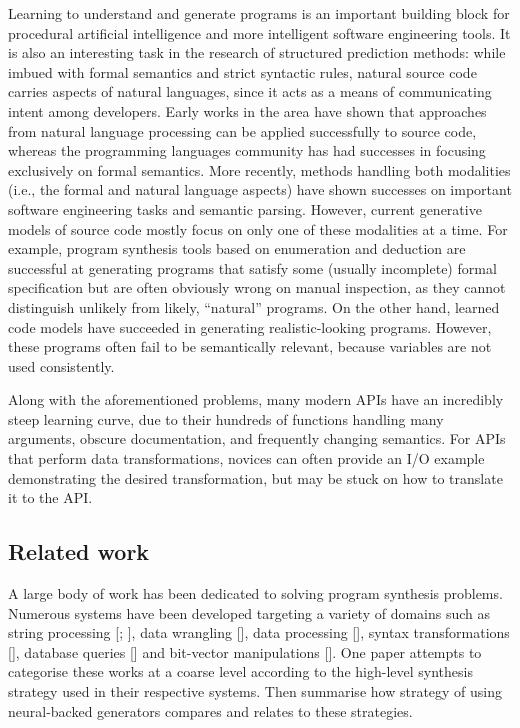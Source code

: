 \documentclass{article}
\begin{document}
Learning to understand and generate programs is an important building block for procedural artificial intelligence and more intelligent software engineering tools. It is also an interesting task in the research of structured prediction methods: while imbued with formal semantics and strict syntactic rules, natural source code carries aspects of natural languages, since it acts as a means of communicating intent among developers. Early works in the area have shown that approaches from natural language processing can be applied successfully to source code, whereas the programming languages community has had successes in focusing exclusively on formal semantics. More recently, methods handling both modalities (i.e., the formal and natural language aspects) have shown successes on important software engineering tasks and semantic parsing. However, current generative models of source code mostly focus on only one of these modalities at a time. For example, program synthesis tools based on enumeration and deduction are successful at generating programs that satisfy some (usually incomplete) formal specification but are often obviously wrong on manual inspection, as they cannot distinguish unlikely from likely, “natural” programs. On the other hand, learned code models have succeeded in generating realistic-looking programs. However, these programs often fail to be semantically relevant, because variables are not used consistently.

Along with the aforementioned problems, many modern APIs have an incredibly steep learning curve, due to their hundreds of functions handling many arguments, obscure documentation, and frequently changing semantics. For APIs that perform data transformations, novices can often provide an I/O example demonstrating the desired transformation, but may be stuck on how to translate it to the API.
\subsection{Related work}
A large body of work has been dedicated to solving program synthesis problems. Numerous systems have been developed targeting a variety of domains such as string processing [\cite{Gulwani2011}; \cite{parisotto2017neuro-symbolic}], data wrangling [\cite{Feng2018}], data processing [\cite{Smith2016}], syntax transformations [\cite{Rolim2017}], database queries [\cite{Yaghmazadeh2017}] and bit-vector manipulations [\cite{Jha2010}]. One paper attempts to categorise these works at a coarse level according to the high-level synthesis strategy used in their respective systems. Then summarise how strategy of using neural-backed generators compares and relates to these strategies.
\end{document}
